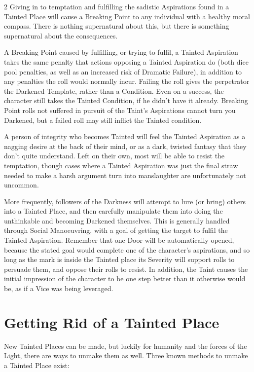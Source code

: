 \begin{multicols}{2}
Giving in to temptation and fulfilling the sadistic Aspirations found in a Tainted Place will cause a Breaking Point to any individual with a healthy moral compass. There is nothing supernatural about this, but there is something supernatural about the consequences. 

A Breaking Point caused by fulfilling, or trying to fulfil, a Tainted Aspiration takes the same penalty that actions opposing a Tainted Aspiration do (both dice pool penalties, as well as an increased risk of Dramatic Failure), in addition to any penalties the roll would normally incur. Failing the roll gives the perpetrator the Darkened Template, rather than a Condition. Even on a success, the character still takes the Tainted Condition, if he didn't have it already. Breaking Point rolls not suffered in pursuit of the Taint’s Aspirations cannot turn you Darkened, but a failed roll may still inflict the Tainted condition.

A person of integrity who becomes Tainted will feel the Tainted Aspiration as a nagging desire at the back of their mind, or as a dark, twisted fantasy that they don’t quite understand. Left on their own, most will be able to resist the temptation, though cases where a Tainted Aspiration was just the final straw needed to make a harsh argument turn into manslaughter are unfortunately not uncommon. 

More frequently, followers of the Darkness will attempt to lure (or bring) others into a Tainted Place, and then carefully manipulate them into doing the unthinkable and becoming Darkened themselves. This is generally handled through Social Manoeuvring, with a goal of getting the target to fulfil the Tainted Aspiration. Remember that one Door will be automatically opened, because the stated goal would complete one of the character’s aspirations, and so long as the mark is inside the Tainted place its Severity will support rolls to persuade them, and oppose their rolls to resist. In addition, the Taint causes the initial impression of the character to be one step better than it otherwise would be, as if a Vice was being leveraged.

\section*{Getting Rid of a Tainted Place}

New Tainted Places can be made, but luckily for humanity and the forces of the Light, there are ways to unmake them as well. Three known methods to unmake a Tainted Place exist:


\end{multicols}
